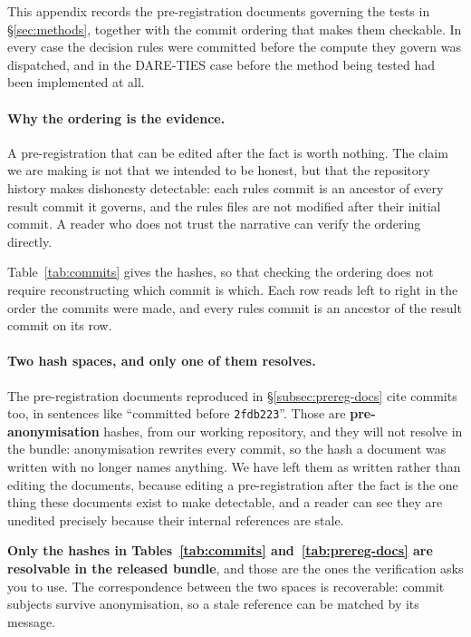 This appendix records the pre-registration documents governing the tests
in \S\ref{sec:methods}, together with the commit ordering that makes them
checkable. In every case the decision rules were committed before the
compute they govern was dispatched, and in the DARE-TIES case before the
method being tested had been implemented at all.

\paragraph{Why the ordering is the evidence.} A pre-registration that can
be edited after the fact is worth nothing. The claim we are making is not
that we intended to be honest, but that the repository history makes
dishonesty detectable: each rules commit is an ancestor of every result
commit it governs, and the rules files are not modified after their
initial commit. A reader who does not trust the narrative can verify the
ordering directly.

Table~\ref{tab:commits} gives the hashes, so that checking the ordering does
not require reconstructing which commit is which. Each row reads left to
right in the order the commits were made, and every rules commit is an
ancestor of the result commit on its row.

\paragraph{Two hash spaces, and only one of them resolves.} The
pre-registration documents reproduced in \S\ref{subsec:prereg-docs} cite
commits too, in sentences like ``committed before \texttt{2fdb223}''. Those
are \textbf{pre-anonymisation} hashes, from our working repository, and they
will not resolve in the bundle: anonymisation rewrites every commit, so the
hash a document was written with no longer names anything. We have left them
as written rather than editing the documents, because editing a
pre-registration after the fact is the one thing these documents exist to
make detectable, and a reader can see they are unedited precisely because
their internal references are stale.

\textbf{Only the hashes in Tables~\ref{tab:commits} and~\ref{tab:prereg-docs}
are resolvable in the released bundle}, and those are the ones the
verification asks you to use. The correspondence between the two spaces is
recoverable: commit subjects survive anonymisation, so a stale reference can
be matched by its message.

